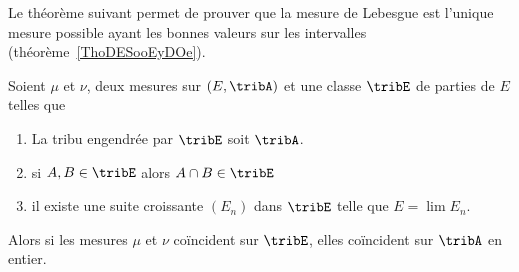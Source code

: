 Le théorème suivant permet de prouver que la mesure de Lebesgue est l'unique mesure possible ayant les bonnes valeurs sur les intervalles (théorème~\ref{ThoDESooEyDOe}).
\begin{theorem} \label{ThoJDYlsXu}
    Soient \( \mu\) et \( \nu\), deux mesures sur \( (E,\tribA)\) et une classe \( \tribE\) de parties de \( E\) telles que
    \begin{enumerate}
        \item
            La tribu engendrée par \( \tribE\) soit \( \tribA\).
        \item
            si \( A,B\in\tribE\) alors \( A\cap B\in\tribE\)
        \item
            il existe une suite croissante \( (E_n)\) dans \( \tribE\) telle que \( E=\lim E_n\).
    \end{enumerate}
    Alors si les mesures \( \mu\) et \( \nu\) coïncident sur \( \tribE\), elles coïncident sur \( \tribA\) en entier.
\end{theorem}

